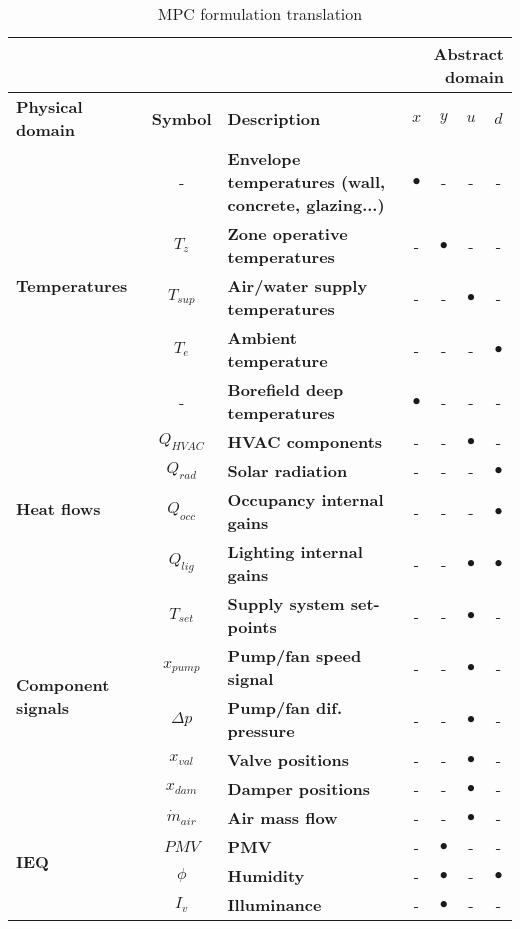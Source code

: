 \documentclass[10pt]{extarticle}
\begin{document}
\begin{table}[b]
\centering
\caption{MPC formulation translation}
\begin{tabular}{l|c|l|cccc}
\toprule
\multicolumn{3}{r}{}  & \multicolumn{4}{r}{\textbf{Abstract domain}} \\
\toprule
\textbf{Physical domain} & \textbf{Symbol} & \textbf{Description} & \textbf{$x$} & \textbf{$y$} & \textbf{$u$} & \textbf{$d$} \\ 
\midrule
\multirow{5}{*}{\textbf{Temperatures}} & - & \textbf{Envelope temperatures (wall, concrete, glazing...)} & $\bullet$ & - & - & - \\ 
& $T_z$ & \textbf{Zone operative temperatures} & - & $\bullet$ & - & - \\
& $T_{sup}$ & \textbf{Air/water supply temperatures} &  - & - & $\bullet$ & - \\
& $T_e$ & \textbf{Ambient temperature} &  - & - & - & $\bullet$ \\
& - & \textbf{Borefield deep temperatures} & $\bullet$ & - & - & - \\
\midrule
\multirow{4}{*}{\textbf{Heat flows}} &
$Q_{HVAC}$ & \textbf{HVAC components} & - & - & $\bullet$ & - \\
& $Q_{rad}$ & \textbf{Solar radiation} & - & - & - & $\bullet$ \\
& $Q_{occ}$ & \textbf{Occupancy internal gains} & - & - & - & $\bullet$ \\
& $Q_{lig}$ & \textbf{Lighting internal gains} & - & - & $\bullet$ & $\bullet$ \\
\midrule
\multirow{5}{*}{\textbf{Component signals}} &
$T_{set}$ & \textbf{Supply system set-points} & - & - & $\bullet$ & - \\
& $x_{pump}$ & \textbf{Pump/fan speed signal} & - & - & $\bullet$ & - \\
& $\Delta p$ & \textbf{Pump/fan dif. pressure} & - & - & $\bullet$ & - \\
& $x_{val}$ & \textbf{Valve positions} & - & - & $\bullet$ & - \\
& $x_{dam}$ & \textbf{Damper positions} & - & - & $\bullet$ & - \\
\midrule
\multirow{4}{*}{\textbf{IEQ}} &
$\dot{m}_{air}$ & \textbf{Air mass flow} & - & - & $\bullet$ & - \\
& $PMV$ & \textbf{PMV} & - & $\bullet$ & - & - \\
& $\phi$ & \textbf{Humidity} & - & $\bullet$ & - & $\bullet$ \\
& $I_v$ & \textbf{Illuminance} & - & $\bullet$ & - & - \\
\bottomrule 
\end{tabular}
\end{table} 
\end{document}
